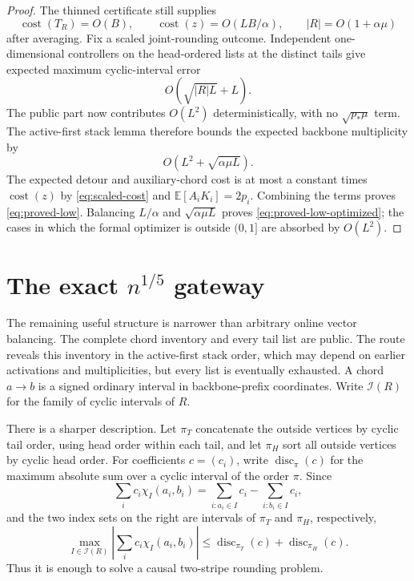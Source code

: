 \documentclass[11pt]{article}
\theoremstyle{remark}
\newcommand{\E}{\mathbb E}
\newcommand{\cost}{\operatorname{cost}}
\newcommand{\disc}{\operatorname{disc}}
\begin{document}
\begin{proof}
The thinned certificate still supplies
\[
  \cost(T_R)=O(B),\qquad
  \cost(z)=O(LB/\alpha),\qquad
  |R|=O(1+\alpha\mu)
\]
after averaging.  Fix a scaled joint-rounding outcome.  Independent
one-dimensional controllers on the head-ordered lists at the distinct tails
give expected maximum cyclic-interval error
\[
  O\!\left(\sqrt{|R|L}+L\right).
\]
The public part now contributes $O(L^2)$ deterministically, with no
$\sqrt{p_*\mu}$ term.  The active-first stack lemma therefore bounds the
expected backbone multiplicity by
\[
  O\!\left(L^2+\sqrt{\alpha\mu L}\right).
\]
The expected detour and auxiliary-chord cost is at most a constant times
$\cost(z)$ by \eqref{eq:scaled-cost} and
$\E[A_iK_i]=2p_i$.  Combining the terms proves
\eqref{eq:proved-low}.  Balancing $L/\alpha$ and
$\sqrt{\alpha\mu L}$ proves \eqref{eq:proved-low-optimized}; the cases in
which the formal optimizer is outside $(0,1]$ are absorbed by $O(L^2)$.
\end{proof}

\section{The exact \texorpdfstring{$n^{1/5}$}{n-to-the-one-fifth} gateway}

The remaining useful structure is narrower than arbitrary online vector
balancing.  The complete chord inventory and every tail list are public.
The route reveals this inventory in the active-first stack order, which may
depend on earlier activations and multiplicities, but every list is eventually
exhausted.  A chord $a\to b$ is a signed ordinary interval in backbone-prefix
coordinates.
Write $\mathcal I(R)$ for the family of cyclic intervals of $R$.

There is a sharper description.  Let $\pi_T$ concatenate the outside
vertices by cyclic tail order, using head order within each tail, and let
$\pi_H$ sort all outside vertices by cyclic head order.  For coefficients
$c=(c_i)$, write $\disc_\pi(c)$ for the maximum absolute sum over a cyclic
interval of the order $\pi$.  Since
\begin{equation}\label{eq:two-stripe-reduction}
 \sum_i c_i\chi_I(a_i,b_i)
 =\sum_{i:a_i\in I}c_i-\sum_{i:b_i\in I}c_i,
\end{equation}
and the two index sets on the right are intervals of $\pi_T$ and $\pi_H$,
respectively,
\begin{equation}\label{eq:two-stripe-bound}
 \max_{I\in\mathcal I(R)}
 \left|\sum_i c_i\chi_I(a_i,b_i)\right|
 \le \disc_{\pi_T}(c)+\disc_{\pi_H}(c).
\end{equation}
Thus it is enough to solve a causal two-stripe rounding problem.
\end{document}
